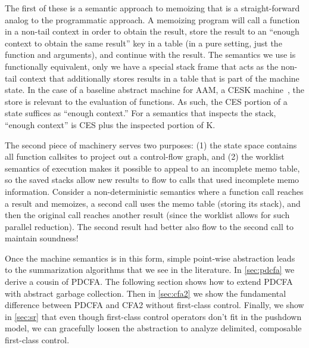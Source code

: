 The first of these is a semantic approach to memoizing that is a straight-forward analog to the programmatic approach.
%
A memoizing program will call a function in a non-tail context in order to obtain the result, store the result to an ``enough context to obtain the same result'' key in a table (in a pure setting, just the function and arguments), and continue with the result.
%
The semantics we use is functionally equivalent, only we have a special stack frame that acts as the non-tail context that additionally stores results in a table that is part of the machine state.
%
In the case of a baseline abstract machine for AAM, a CESK machine~\citep{dvanhorn:Felleisen1987Calculus}, the store is relevant to the evaluation of functions.
%
As such, the CES portion of a state suffices as ``enough context.''
%
For a semantics that inspects the stack, ``enough context'' is CES plus the inspected portion of K.

The second piece of machinery serves two purposes:
%
(1) the state space contains all function callsites to project out a control-flow graph, and %
(2) the worklist semantics of execution makes it possible to appeal to an incomplete memo table, so the saved stacks allow new results to flow to calls that used incomplete memo information.
%
Consider a non-deterministic semantics where a function call reaches a result and memoizes, a second call uses the memo table (storing its stack), and then the original call reaches another result (since the worklist allows for such parallel reduction).
%
The second result had better also flow to the second call to maintain soundness!

Once the machine semantics is in this form, simple point-wise abstraction leads to the summarization algorithms that we see in the literature.
%
In \autoref{sec:pdcfa} we derive a cousin of PDCFA.
%
The following section shows how to extend PDCFA with abstract garbage collection. %
%
Then in \autoref{sec:cfa2} we show the fundamental difference between PDCFA and CFA2 without first-class control. %
%
%
Finally, we show in \autoref{sec:sr} that even though first-class control operators don't fit in the pushdown model, we can gracefully loosen the abstraction to analyze delimited, composable first-class control.

